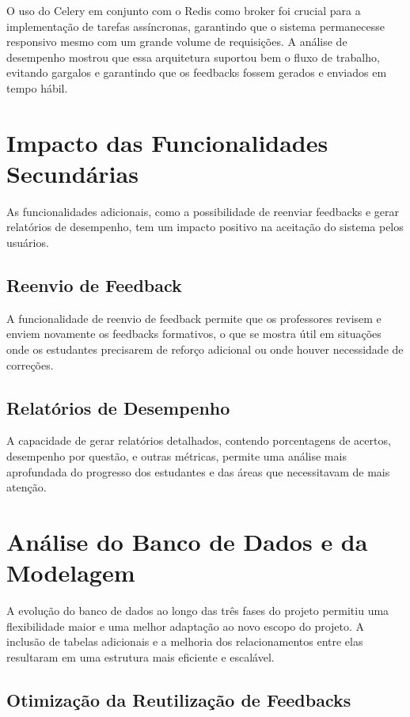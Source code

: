 O uso do Celery em conjunto com o Redis como broker foi crucial para a implementação de tarefas assíncronas, garantindo que o sistema permanecesse responsivo mesmo com um grande volume de requisições. A análise de desempenho mostrou que essa arquitetura suportou bem o fluxo de trabalho, evitando gargalos e garantindo que os feedbacks fossem gerados e enviados em tempo hábil.

\section{Impacto das Funcionalidades Secundárias}

As funcionalidades adicionais, como a possibilidade de reenviar feedbacks e gerar relatórios de desempenho, tem um impacto positivo na aceitação do sistema pelos usuários. 

\subsection{Reenvio de Feedback}

A funcionalidade de reenvio de feedback permite que os professores revisem e enviem novamente os feedbacks formativos, o que se mostra útil em situações onde os estudantes precisarem de reforço adicional ou onde houver necessidade de correções.

\subsection{Relatórios de Desempenho}

A capacidade de gerar relatórios detalhados, contendo porcentagens de acertos, desempenho por questão, e outras métricas, permite uma análise mais aprofundada do progresso dos estudantes e das áreas que necessitavam de mais atenção.

\section{Análise do Banco de Dados e da Modelagem}

A evolução do banco de dados ao longo das três fases do projeto permitiu uma flexibilidade maior e uma melhor adaptação ao novo escopo do projeto. A inclusão de tabelas adicionais e a melhoria dos relacionamentos entre elas resultaram em uma estrutura mais eficiente e escalável.

\subsection{Otimização da Reutilização de Feedbacks}

